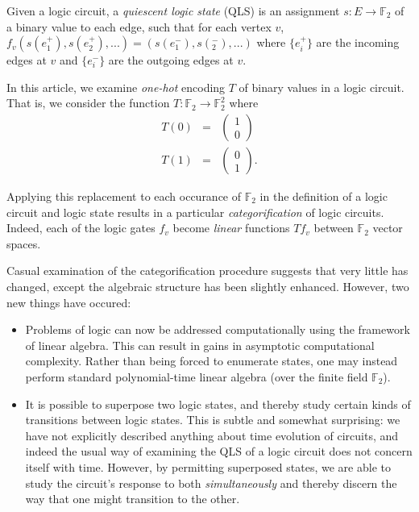 \documentclass{amsart}
\theoremstyle{plain}
\theoremstyle{definition}
\begin{document}
Given a logic circuit, a {\it quiescent logic state} (QLS) is an assignment $s:E \to
\mathbb{F}_2$ of a binary value to each edge, such that for each
vertex $v$, $f_v(s(e^+_1),s(e^+_2),...)=(s(e^-_1),s(^-_2),...)$ where
$\{e^+_i\}$ are the incoming edges at $v$ and $\{e^-_i\}$ are the
outgoing edges at $v$.

In this article, we examine {\it one-hot} encoding $T$ of binary values in
a logic circuit.  That is, we consider the function
$T:\mathbb{F}_2\to\mathbb{F}_2^2$ where 
\begin{eqnarray*}
T(0)&=&\begin{pmatrix}1\\0\end{pmatrix}\\
T(1)&=&\begin{pmatrix}0\\1\end{pmatrix}.  
\end{eqnarray*}

Applying this replacement to
    each occurance of $\mathbb{F}_2$ in the definition of a logic
    circuit and logic state results in a particular {\it
      categorification} of logic circuits.  Indeed, each of the logic
    gates $f_v$ become {\it linear} functions $T f_v$ between $\mathbb{F}_2$ vector
    spaces. 

Casual examination of the categorification procedure suggests that
very little has changed, except the algebraic structure has been
slightly enhanced.  However, two new things have occured:
\begin{itemize}
\item Problems of logic can now be addressed computationally using the
  framework of linear algebra.  This can result in gains in asymptotic
  computational complexity.  Rather than being forced to enumerate
  states, one may instead perform standard polynomial-time linear
  algebra (over the finite field $\mathbb{F}_2$).
\item It is possible to superpose two logic states, and thereby
  study certain kinds of transitions between logic states.  This is
  subtle and somewhat surprising: we have not explicitly described
  anything about time evolution of circuits, and indeed the usual way
  of examining the QLS of a logic circuit does not concern itself with
  time.  However, by permitting superposed states, we are able to
  study the circuit's response to both {\it simultaneously} and
  thereby discern the way that one might transition to the other. 
\end{itemize} 
\end{document}
